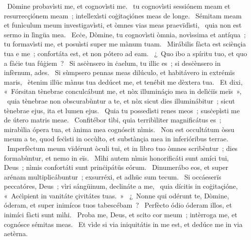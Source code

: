 ~Dòmine probavìsti me, et cognovìsti me. 
~tu cognovìsti sessiónem meam et resurrecçiónem meam~; intellexìsti coġitaçiónes meas de longe. 
~Sémitam meam et funìculum meum investigavìsti, et òmnes vias meas praevïdìsti, 
~quia non est sermo in lìngüa mea. 
~Ecċe, Dòmine, tu cognovìsti òmnia, novìssima et antíqua~; tu formavìsti me, et posuìsti super me mànum tuam. 
~Mirábilis fàcta est sciènçia tua e me~; confortáta est, et non pótero ad eam. 
~¿~Quo ibo a spíritu tuo, et quo a fàċie tua fúġiem~? 
~Si asċènsero in ċaelum, tu illic es~; si desċènsero in infèrnum, ades. 
~Si sùmpsero pennas meas dilúculo, et habitávero in extrémïs maris, 
~ètenim illüc mànus tua dedúcet me, et tenébit me dèxtera tua. 
~Et dixi, «~Fórsitan tènebrae conculcábunt me, et nòx illumináçio mea in delìċiïs meïs~», 
~quia tènebrae non obscurabùntur a te, et nòx sicut dies illuminábitur~; sicut tènebrae ejus, ita et lumen ejus. 
~Quia tu possedìsti renes meos~; susċepìsti me de útero matris meae. 
~Confitébor tìbi, quia terribìliter magnificátus es~; mirabìlia ópera tua, et ànima mea cognóscit nìmis. 
~Non est occultátum òssu meum a te, quod feċìsti in occùlto, et substànçia mea in inferióribus terrae. 
~Imperfèctum meum vïdérunt òculi tui, et in lìbro tuo òmnes scribèntur~; dies formabùntur, et nemo in eïs. 
~Mìhi autem nìmis honorificáti sunt amíci tui, Deus~; nìmis confortáti sunt prinċipátüs eórum. 
~Dinumerábo eos, et super arénam multiplicábuntur~; exsurréxi, et adhüc sum tecum. 
~Si occáeserïs peccatóres, Deus~; vìri sángüinum, declináte a me, 
~quia dícitis in coġitaçióne, «~Acċìpient in vanitáte çivitátes tuas.~»
~¿~Nonne qui odérunt te, Dòmine, óderam, et super inimícos tuos tabescébam~? 
~Perfècto ódio óderam illos, et inimíci fàcti sunt mìhi. 
~Proba me, Deus, et scito cor meum~; intèrroga me, et cognósce sémitas meas. 
~Et vìde si via iniquitátis in me est, et dedúce me in via aetèrna. 
